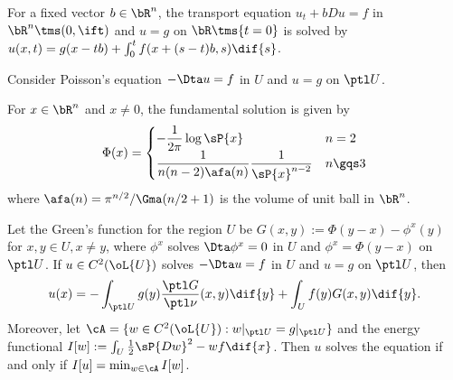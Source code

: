 \documentclass[a4paper, twoside]{article}
\begin{document}

\begin{thm}
    For a fixed vector $b\in\bR^{n}$, the transport equation $u_{t}+bDu=f$ in $\bR^{n}\tms(0,\ift)$ and $u=g$ on $\bR\tms\{t=0\}$ is solved by $u(x,t)=g(x-tb)+\int_{0}^{t}f(x+(s-t)b,s)\dif{s}$.
\end{thm}


\begin{thm}
    Consider Poisson's equation $-\Dta u=f$ in $U$ and $u=g$ on $\ptl U$.

    For $x\in\bR^{n}$ and $x\neq 0$, the fundamental solution is given by
    \[
        \Phi(x)=\begin{cases}
          -\dfrac{1}{2\pi}\log\sP{x} & n = 2 \\
          \dfrac{1}{n(n-2)\afa(n)}\dfrac{1}{\sP{x}^{n-2}} & n\gqs3
        \end{cases}
    \]
    where $\afa(n)=\pi^{n/2}/\Gma(n/2+1)$ is the volume of unit ball in $\bR^{n}$.

    Let the Green's function for the region $U$ be $G(x,y):=\Phi(y-x)-\phi^{x}(y)$ for $x,y\in U, x\neq y$, where $\phi^{x}$ solves $\Dta\phi^{x}=0$ in $U$ and $\phi^{x}=\Phi(y-x)$ on $\ptl U$. If $u\in C^{2}(\oL{U})$ solves $-\Dta u=f$ in $U$ and $u=g$ on $\ptl U$, then
    \[
        u(x)=-\int_{\ptl U}g(y)\frac{\ptl G}{\ptl \nu}(x,y)\dif{y}+\int_{U}f(y)G(x,y)\dif{y}.
    \]
    Moreover, let $\cA=\{w\in C^{2}(\oL{U}):w|_{\ptl U}=g|_{\ptl U}\}$ and the energy functional $I[w]:=\int_{U}\frac{1}{2}\sP{Dw}^{2}-wf\dif{x}$. Then $u$ solves the equation if and only if $I[u]=\min_{w\in\cA}I[w]$.
\end{thm}
\end{document}
